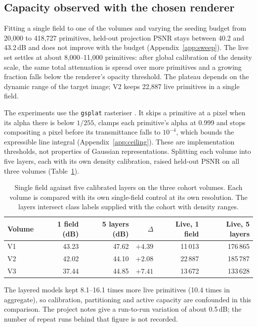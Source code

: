 \documentclass[11pt,a4paper]{article}
\newcommand{\code}[1]{\texttt{\small #1}}
\begin{document}
\subsection{Capacity observed with the chosen renderer}

Fitting a single field to one of the volumes and varying the seeding budget from 20{,}000 to 418{,}727
primitives, held-out projection PSNR stays between 40.2 and 43.2\,dB and does not improve
with the budget (Appendix~\ref{app:sweep}). The live set settles at about 8{,}000--11{,}000
primitives: after global calibration of the density scale, the same total attenuation is
spread over more primitives and a growing fraction falls below the renderer's opacity
threshold. The plateau depends on the dynamic range of the target image; V2 keeps 22{,}887
live primitives in a single field.

The experiments use the \code{gsplat} rasteriser \cite{gsplat}. It skips a primitive at a pixel when its
alpha there is below $1/255$, clamps each primitive's alpha at 0.999 and stops compositing a
pixel before its transmittance falls to $10^{-4}$, which bounds the expressible line
integral (Appendix~\ref{app:ceiling}). These are implementation thresholds, not properties
of Gaussian representations. Splitting each volume into five layers, each with its own
density calibration, raised held-out PSNR on all three volumes
(Table~\ref{tab:layers}).

\begin{table}[ht]
\centering
\caption{Single field against five calibrated layers on the three cohort volumes. Each
volume is compared with its own single-field control at its own resolution. The layers
intersect class labels supplied with the cohort with density ranges.}
\label{tab:layers}
\begin{tabular}{lrrrrr}
\toprule
\textbf{Volume} & \textbf{1 field (dB)} & \textbf{5 layers (dB)} & \textbf{$\Delta$} &
\textbf{Live, 1 field} & \textbf{Live, 5 layers}\\
\midrule
V1 & 43.23 & 47.62 & $+4.39$ & 11\,013 & 176\,865\\
V2 & 42.02 & 44.10 & $+2.08$ & 22\,887 & 185\,787\\
V3 & 37.44 & 44.85 & $+7.41$ & 13\,672 & 133\,628\\
\bottomrule
\end{tabular}
\end{table}

The layered models kept 8.1--16.1 times more live primitives (10.4 times in aggregate), so
calibration, partitioning and active capacity are confounded in this comparison. The project
notes give a run-to-run variation of about 0.5\,dB; the number of repeat runs behind that
figure is not recorded.
\end{document}
